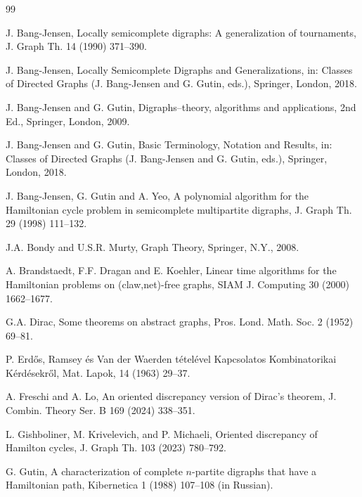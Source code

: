 \documentclass{article}
\newcommand{\2}{\vspace{0.2cm}}
\begin{document}
\begin{thebibliography}{99}

 J. Bang-Jensen, Locally semicomplete digraphs: A generalization of tournaments, J. Graph Th. 14 (1990) 371--390.

  J. Bang-Jensen, Locally Semicomplete Digraphs and Generalizations, in: Classes of Directed Graphs (J. Bang-Jensen and G. Gutin, eds.), Springer, London, 2018.

 J. Bang-Jensen and G. Gutin, Digraphs--theory, algorithms and applications, 2nd Ed., Springer, London, 2009.

 J. Bang-Jensen and G. Gutin, Basic Terminology, Notation and Results, in: Classes of Directed Graphs (J. Bang-Jensen and G. Gutin, eds.), Springer, London, 2018.

  J. Bang-Jensen, G. Gutin and A. Yeo, A polynomial algorithm for the Hamiltonian cycle problem in semicomplete multipartite digraphs, J. Graph Th.  29 (1998) 111--132.

  J.A. Bondy and U.S.R. Murty, Graph Theory, Springer, N.Y., 2008.

  A. Brandstaedt, F.F. Dragan and E. Koehler, Linear time algorithms for the Hamiltonian problems on (claw,net)-free graphs, SIAM J. Computing 30 (2000) 1662--1677.

 G.A. Dirac, Some theorems on abstract graphs, Pros. Lond. Math. Soc. 2 (1952) 69--81.

 P. Erd{\H o}s, Ramsey {\' e}s Van der Waerden t{\' e}tel{\' e}vel Kapcsolatos Kombinatorikai K{\' e}rd{\' e}sekr{\H o}l, Mat. Lapok, 14 (1963) 29--37.

 A. Freschi and  A. Lo, An oriented discrepancy version of Dirac’s theorem,  J. Combin. Theory Ser. B 169 (2024) 338--351.


 L. Gishboliner, M. Krivelevich, and P. Michaeli, Oriented discrepancy of Hamilton cycles, J. Graph Th. 103 (2023) 780--792.


 G. Gutin, A characterization of complete $n$-partite digraphs that have a Hamiltonian path, Kibernetica  1 (1988) 107--108 (in Russian).


\end{thebibliography}
\end{document}
